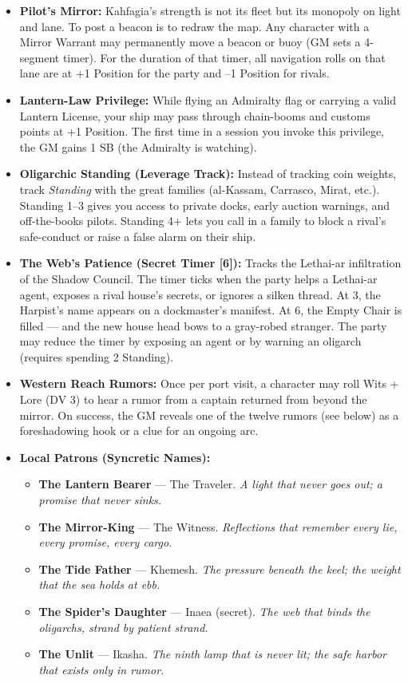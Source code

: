 \begin{itemize}
\item \textbf{Pilot's Mirror:} Kahfagia's strength is not its fleet but its monopoly on light and lane. To post a beacon is to redraw the map. Any character with a Mirror Warrant may permanently move a beacon or buoy (GM sets a 4-segment timer). For the duration of that timer, all navigation rolls on that lane are at +1 Position for the party and --1 Position for rivals.
\item \textbf{Lantern-Law Privilege:} While flying an Admiralty flag or carrying a valid Lantern License, your ship may pass through chain-booms and customs points at +1 Position. The first time in a session you invoke this privilege, the GM gains 1 SB (the Admiralty is watching).
\item \textbf{Oligarchic Standing (Leverage Track):} Instead of tracking coin weights, track \emph{Standing} with the great families (al-Kassam, Carrasco, Mirat, etc.). Standing 1--3 gives you access to private docks, early auction warnings, and off-the-books pilots. Standing 4+ lets you call in a family to block a rival's safe-conduct or raise a false alarm on their ship.
\item \textbf{The Web's Patience (Secret Timer [6]):} Tracks the Lethai-ar infiltration of the Shadow Council. The timer ticks when the party helps a Lethai-ar agent, exposes a rival house's secrets, or ignores a silken thread. At 3, the Harpist's name appears on a dockmaster's manifest. At 6, the Empty Chair is filled --- and the new house head bows to a gray-robed stranger. The party may reduce the timer by exposing an agent or by warning an oligarch (requires spending 2 Standing).
\item \textbf{Western Reach Rumors:} Once per port visit, a character may roll Wits + Lore (DV 3) to hear a rumor from a captain returned from beyond the mirror. On success, the GM reveals one of the twelve rumors (see below) as a foreshadowing hook or a clue for an ongoing arc.
\item \textbf{Local Patrons (Syncretic Names):}
  \begin{itemize}
    \item \textbf{The Lantern Bearer} --- The Traveler. \textit{A light that never goes out; a promise that never sinks.}
    \item \textbf{The Mirror-King} --- The Witness. \textit{Reflections that remember every lie, every promise, every cargo.}
    \item \textbf{The Tide Father} --- Khemesh. \textit{The pressure beneath the keel; the weight that the sea holds at ebb.}
    \item \textbf{The Spider's Daughter} --- Inaea (secret). \textit{The web that binds the oligarchs, strand by patient strand.}
    \item \textbf{The Unlit} --- Ikasha. \textit{The ninth lamp that is never lit; the safe harbor that exists only in rumor.}
  \end{itemize}
\end{itemize}

